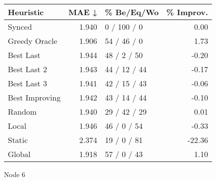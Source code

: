 \begin{tabular}{lrlr}
\toprule
\textbf{Heuristic} & \textbf{MAE ↓} & \textbf{\% Be/Eq/Wo} & \textbf{\% Improv.} \\
\midrule
            Synced &          1.940 &          0 / 100 / 0 &                0.00 \\
     Greedy Oracle &          1.906 &          54 / 46 / 0 &                1.73 \\
         Best Last &          1.944 &          48 / 2 / 50 &               -0.20 \\
       Best Last 2 &          1.943 &         44 / 12 / 44 &               -0.17 \\
       Best Last 3 &          1.941 &         42 / 15 / 43 &               -0.06 \\
    Best Improving &          1.942 &         43 / 14 / 44 &               -0.10 \\
            Random &          1.940 &         29 / 42 / 29 &                0.01 \\
             Local &          1.946 &          46 / 0 / 54 &               -0.33 \\
            Static &          2.374 &          19 / 0 / 81 &              -22.36 \\
            Global &          1.918 &          57 / 0 / 43 &                1.10 \\
\bottomrule
\end{tabular}
\caption{Node 6}
\label{tab:hr_non_lr01_le1_bs2_6}
